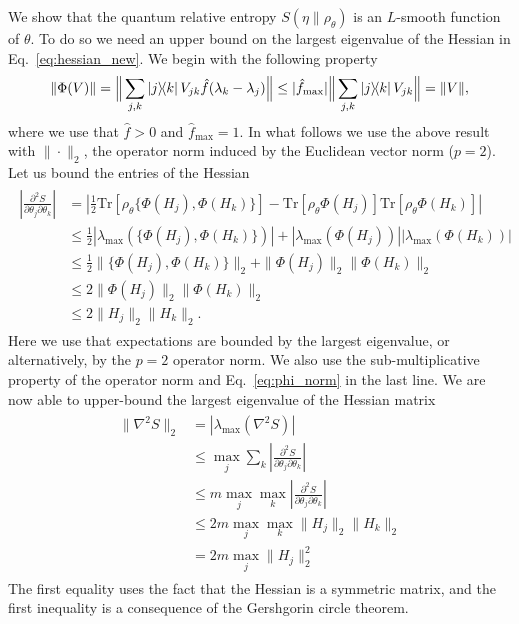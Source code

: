 \documentclass[
    aps,
    prx,
    floatfix,
    nofootinbib,
    onecolumn
]{revtex4-2}
\newcommand{\Tr}{\mathrm{Tr}}
\begin{document}
We show that the quantum relative entropy $S(\eta \|\rho_\theta)$ is an $L$-smooth function of $\theta$. To do so we need an upper bound on the largest eigenvalue of the Hessian in Eq.~\eqref{eq:hessian_new}. 
We begin with the following property
\begin{align}
\label{eq:phi_norm}
\| \Phi(V) \| = \Big \| \sum_{j,k} \ketbra{j}{k} V_{jk} \hat{f}(\lambda_k - \lambda_j) \Big \| \leq | \hat{f}_{\max} | \Big \| \sum_{j,k} \ketbra{j}{k} V_{jk} \Big \| = \| V \| ,
\end{align}
where we use that $\hat{f}>0$ and $\hat{f}_{\max} = 1$. In what follows we use the above result with $\| \cdot \|_2$, the operator norm induced by the Euclidean vector norm ($p=2$). 
Let us bound the entries of the Hessian
\begin{align}
\begin{split}
\left| \frac{\partial^2 S}{\partial \theta_{j} \partial \theta_{k}} \right| &= \left | \frac{1}{2} \Tr[ \rho_\theta \{ \Phi(H_j), \Phi(H_k) \}] - \Tr[ \rho_\theta \Phi(H_j)] \Tr[ \rho_\theta \Phi(H_k)] \right| \\
&\leq \frac{1}{2}  \left | \lambda_{\max}( \{ \Phi(H_j), \Phi(H_k) \} ) \right| + \left | \lambda_{\max}( \Phi(H_j) ) \right|  \left | \lambda_{\max} ( \Phi(H_k) ) \right| \\
&\leq \frac{1}{2} \| \{\Phi(H_j), \Phi(H_k)\} \|_2 +  \| \Phi(H_j) \|_2 \| \Phi(H_k) \|_2 \\ 
&\leq 2 \| \Phi(H_j) \|_2 \| \Phi(H_k) \|_2 \\
&\leq 2 \| H_j \|_2 \| H_k \|_2 .
\end{split}
\end{align}
Here we use that expectations are bounded by the largest eigenvalue, or alternatively, by the $p=2$ operator norm. We also use the sub-multiplicative property of the operator norm and Eq.~\eqref{eq:phi_norm} in the last line. 
We are now able to upper-bound the largest eigenvalue of the Hessian matrix
\begin{align}
\begin{split}
\label{eq:hess_upper_bound}
\| \nabla^2 S \|_2 &= | \lambda_\mathrm{max}(\nabla^2 S)| \\
&\leq \max_j \sum_k  \left| \frac{\partial^2 S}{\partial \theta_{j} \partial \theta_{k}} \right| \\
&\leq m \max_j \max_k  \left| \frac{\partial^2 S}{\partial \theta_{j} \partial \theta_{k}} \right| \\
&\leq 2m \max_j \max_k \| H_j \|_2 \| H_k \|_2 \\
&= 2 m \max_j \| H_j \|_2^2
\end{split}
\end{align}
The first equality uses the fact that the Hessian is a symmetric matrix, and the first inequality is a consequence of the Gershgorin circle theorem.
\end{document}
